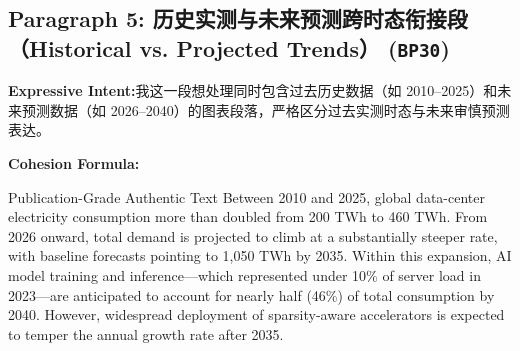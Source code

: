 \subsection*{Paragraph 5: 历史实测与未来预测跨时态衔接段（Historical vs. Projected Trends） (\texttt{BP30})}
\noindent\textbf{Expressive Intent:}\enspace 我这一段想处理同时包含过去历史数据（如 2010--2025）和未来预测数据（如 2026--2040）的图表段落，严格区分过去实测时态与未来审慎预测表达。\par
\noindent\textbf{Cohesion Formula:}\par\vspace{4pt}
\begin{ExampleBox}{Publication-Grade Authentic Text}
Between 2010 and 2025, global data-center electricity consumption more than doubled from 200 TWh to 460 TWh. From 2026 onward, total demand is projected to climb at a substantially steeper rate, with baseline forecasts pointing to 1,050 TWh by 2035. Within this expansion, AI model training and inference---which represented under 10\% of server load in 2023---are anticipated to account for nearly half (46\%) of total consumption by 2040. However, widespread deployment of sparsity-aware accelerators is expected to temper the annual growth rate after 2035.
\end{ExampleBox}
